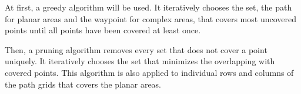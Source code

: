 At first, a greedy algorithm will be used. It iteratively chooses the set, the path for planar areas and the waypoint for complex areas, that covers most uncovered points until all points have been covered at least once. 

Then, a pruning algorithm removes every set that does not cover a point uniquely. It iteratively chooses the set that minimizes the overlapping with covered points. This algorithm is also applied to individual rows and columns of the path grids that covers the planar areas.






